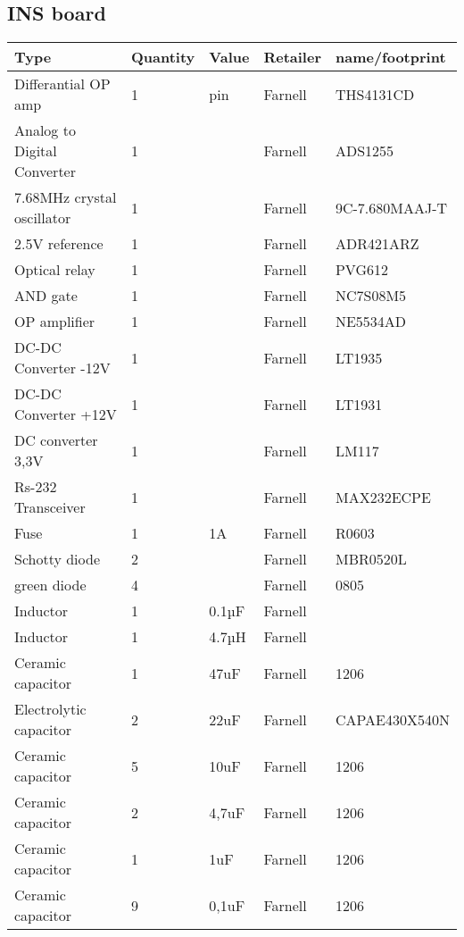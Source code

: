 \documentclass[10pt, titlepage]{article}
\begin{document}
\subsection{INS board}
\begin{center}
\begin{tabularx}{\textwidth}{|X|l|l|l|l|}
    \hline
   \textbf{Type} & \textbf{Quantity} & \textbf{Value} & \textbf{Retailer} & \textbf{name/footprint} \\ \hline
    Differantial OP amp & 1 &  pin & Farnell & THS4131CD \\ \hline
    Analog to Digital Converter & 1 &  & Farnell & ADS1255 \\ \hline
    7.68MHz crystal oscillator & 1 &  & Farnell & 9C-7.680MAAJ-T \\ \hline
    2.5V reference & 1 &  & Farnell & ADR421ARZ \\ \hline
    Optical relay & 1 &  & Farnell & PVG612 \\ \hline
    AND gate & 1 &  & Farnell & NC7S08M5 \\ \hline
    OP amplifier & 1 &  & Farnell & NE5534AD \\ \hline
    DC-DC Converter -12V & 1 &  & Farnell & LT1935 \\ \hline
    DC-DC Converter +12V & 1 &  & Farnell & LT1931 \\ \hline
    DC converter 3,3V & 1 &  & Farnell & LM117 \\ \hline
    Rs-232 Transceiver & 1 &  & Farnell & MAX232ECPE \\ \hline
    Fuse & 1 & 1A & Farnell & R0603\\ \hline
    Schotty diode & 2 &  & Farnell & MBR0520L \\ \hline
    green diode & 4 &  & Farnell & 0805  \\ \hline
    Inductor & 1 & 0.1µF & Farnell &  \\ \hline
    Inductor & 1 & 4.7µH & Farnell &  \\ \hline
    Ceramic capacitor & 1 & 47uF & Farnell & 1206 \\ \hline
    Electrolytic capacitor & 2 & 22uF & Farnell & CAPAE430X540N \\ \hline
    Ceramic capacitor & 5 & 10uF & Farnell & 1206 \\ \hline
    Ceramic capacitor & 2 & 4,7uF & Farnell & 1206 \\ \hline
    Ceramic capacitor & 1 & 1uF & Farnell & 1206 \\ \hline
    Ceramic capacitor & 9 & 0,1uF & Farnell & 1206 \\ \hline

\end{tabularx}
\end{center}
\end{document}
